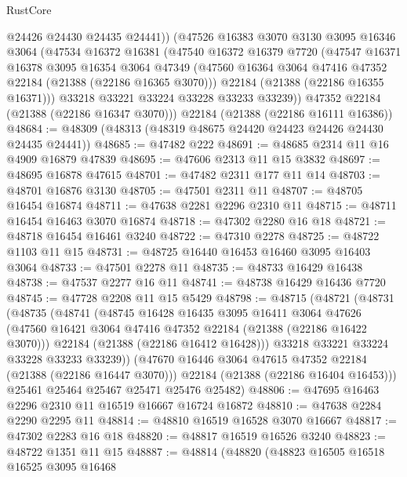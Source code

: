 \begin{lexlean}{RustCore}
\begin{coremodule}
        @24426
        @24430
        @24435
        @24441))
    (@47526
      @16383
      @3070
      @3130
      @3095
      @16346
      @3064
      (@47534
        @16372
        @16381
        (@47540
          @16372
          @16379
          @7720
          (@47547
            @16371
            @16378
            @3095
            @16354
            @3064
            @47349
            (@47560 @16364 @3064 @47416 @47352 @22184 (@21388 (@22186 @16365 @3070)))
            @22184
            (@21388 (@22186 @16355 @16371)))
          @33218
          @33221
          @33224
          @33228
          @33233
          @33239))
      @47352
      @22184
      (@21388 (@22186 @16347 @3070)))
    @22184
    (@21388 (@22186 @16111 @16386))
@48684 := @48309 (@48313 (@48319 @48675 @24420 @24423 @24426 @24430 @24435 @24441))
@48685 := @47482 @222
@48691 := @48685 @2314 @11 @16 @4909 @16879 @47839
@48695 := @47606 @2313 @11 @15 @3832
@48697 := @48695 @16878 @47615
@48701 := @47482 @2311 @177 @11 @14
@48703 := @48701 @16876 @3130
@48705 := @47501 @2311 @11
@48707 := @48705 @16454 @16874
@48711 := @47638 @2281 @2296 @2310 @11
@48715 := @48711 @16454 @16463 @3070 @16874
@48718 := @47302 @2280 @16 @18
@48721 := @48718 @16454 @16461 @3240
@48722 := @47310 @2278
@48725 := @48722 @1103 @11 @15
@48731 := @48725 @16440 @16453 @16460 @3095 @16403 @3064
@48733 := @47501 @2278 @11
@48735 := @48733 @16429 @16438
@48738 := @47537 @2277 @16 @11
@48741 := @48738 @16429 @16436 @7720
@48745 := @47728 @2208 @11 @15 @5429
@48798 := @48715
    (@48721
      (@48731
        (@48735
          (@48741
            (@48745
              @16428
              @16435
              @3095
              @16411
              @3064
              @47626
              (@47560 @16421 @3064 @47416 @47352 @22184 (@21388 (@22186 @16422 @3070)))
              @22184
              (@21388 (@22186 @16412 @16428)))
            @33218
            @33221
            @33224
            @33228
            @33233
            @33239))
        (@47670 @16446 @3064 @47615 @47352 @22184 (@21388 (@22186 @16447 @3070)))
        @22184
        (@21388 (@22186 @16404 @16453)))
      @25461
      @25464
      @25467
      @25471
      @25476
      @25482)
@48806 := @47695 @16463 @2296 @2310 @11 @16519 @16667 @16724 @16872
@48810 := @47638 @2284 @2290 @2295 @11
@48814 := @48810 @16519 @16528 @3070 @16667
@48817 := @47302 @2283 @16 @18
@48820 := @48817 @16519 @16526 @3240
@48823 := @48722 @1351 @11 @15
@48887 := @48814
    (@48820
      (@48823
        @16505
        @16518
        @16525
        @3095
        @16468

\end{coremodule}
\end{lexlean}
